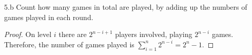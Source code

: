 \begin{exercise}{5.b}
Count how many games in total are played, by adding up the numbers of games
played in each round.
\end{exercise}

\begin{proof}
        On level $i$ there are $2^{n-i+1}$ players involved, playing $2^{n-i}$ games. Therefore, the number of games played is $\sum_{i=1}^n 2^{n-i} = 2^n-1$.
\end{proof}


